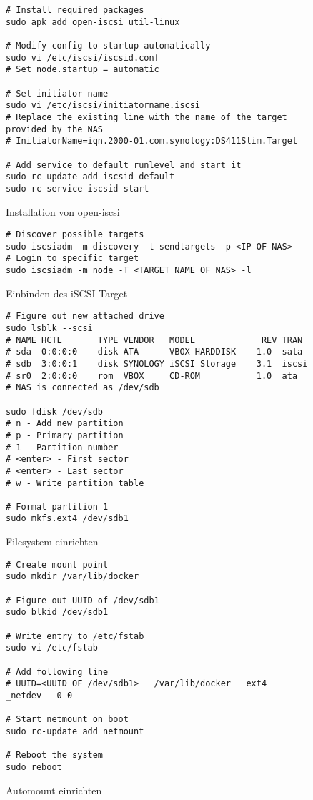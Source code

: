 \documentclass[12pt,a4paper]{article}
\begin{document}
\begin{figure}[H]
\begin{lstlisting}
# Install required packages
sudo apk add open-iscsi util-linux

# Modify config to startup automatically
sudo vi /etc/iscsi/iscsid.conf
# Set node.startup = automatic

# Set initiator name
sudo vi /etc/iscsi/initiatorname.iscsi
# Replace the existing line with the name of the target provided by the NAS
# InitiatorName=iqn.2000-01.com.synology:DS411Slim.Target

# Add service to default runlevel and start it
sudo rc-update add iscsid default
sudo rc-service iscsid start
\end{lstlisting}
\caption{Installation von open-iscsi}\label{fig:Installation von open-iscsi}
\end{figure}

\begin{figure}[H]
\begin{lstlisting}
# Discover possible targets
sudo iscsiadm -m discovery -t sendtargets -p <IP OF NAS>
# Login to specific target
sudo iscsiadm -m node -T <TARGET NAME OF NAS> -l
\end{lstlisting}
\caption{Einbinden des iSCSI-Target}\label{fig:Einbinden des iSCSI-Target}
\end{figure}

\begin{figure}[H]
\begin{lstlisting}
# Figure out new attached drive
sudo lsblk --scsi
# NAME HCTL       TYPE VENDOR   MODEL             REV TRAN
# sda  0:0:0:0    disk ATA      VBOX HARDDISK    1.0  sata
# sdb  3:0:0:1    disk SYNOLOGY iSCSI Storage    3.1  iscsi
# sr0  2:0:0:0    rom  VBOX     CD-ROM           1.0  ata
# NAS is connected as /dev/sdb

sudo fdisk /dev/sdb
# n - Add new partition
# p - Primary partition
# 1 - Partition number
# <enter> - First sector
# <enter> - Last sector
# w - Write partition table

# Format partition 1
sudo mkfs.ext4 /dev/sdb1
\end{lstlisting}
\caption{Filesystem einrichten}\label{fig:Filesystem einrichten}
\end{figure}

\begin{figure}[H]
\begin{lstlisting}
# Create mount point
sudo mkdir /var/lib/docker

# Figure out UUID of /dev/sdb1
sudo blkid /dev/sdb1

# Write entry to /etc/fstab
sudo vi /etc/fstab

# Add following line
# UUID=<UUID OF /dev/sdb1>   /var/lib/docker   ext4   _netdev   0 0

# Start netmount on boot
sudo rc-update add netmount

# Reboot the system
sudo reboot
\end{lstlisting}
\caption{Automount einrichten}\label{fig:Automount einrichten}
\end{figure}
\end{document}
